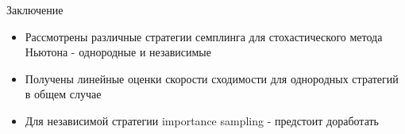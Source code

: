 \documentclass{beamer}
\begin{document}
\begin{frame}{Заключение}
    \begin{block}{}
    \begin{itemize}
        \item Рассмотрены различные стратегии семплинга для стохастического метода Ньютона - однородные и независимые
        \item Получены линейные оценки скорости сходимости для однородных стратегий в общем случае
        \item Для независимой стратегии importance sampling - {\color{red} предстоит доработать}
    \end{itemize}
    \end{block}
\end{frame}
\end{document}
